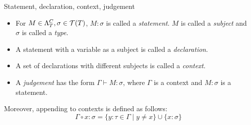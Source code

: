 \documentclass[main.tex]{subfiles}
\begin{document}
\begin{defn}
    Statement, declaration, context, judgement \cite[chap.~2.4]{ttfp}
    \begin{itemize}
        \item For $M \in \Lambda_T^C, \sigma \in \mathcal{T}( T )$, $M : \sigma$ is called
            a \emph{statement}. $M$ is called a \emph{subject} and $\sigma$
            is called a \emph{type}.
        \item A statement with a variable as a subject is called a \emph{declaration}.
        \item A set of declarations with different subjects is called a \emph{context}.
        \item A \emph{judgement} has the form $\Gamma \vdash M: \sigma$, where
            $\Gamma$ is a context and $M: \sigma$ is a statement.
    \end{itemize}

    Moreover, appending to contexts is defined as follows:
    \[ \Gamma \circ x : \sigma = \{ y : \tau \in \Gamma \mid y \neq x \}
       \cup \{ x : \sigma \} \]
\end{defn}
\end{document}
